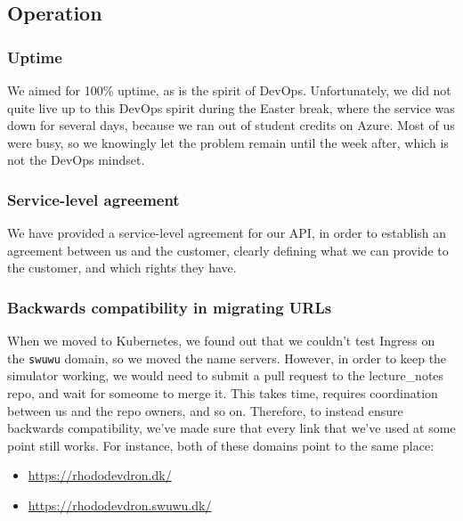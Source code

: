 \subsection{Operation}

\subsubsection{Uptime}

We aimed for 100\% uptime, as is the spirit of DevOps. Unfortunately, we did not quite live up to this DevOps spirit during the Easter break, where the service was down for several days, because we ran out of student credits on Azure. Most of us were busy, so we knowingly let the problem remain until the week after, which is not the DevOps mindset.


\subsubsection{Service-level agreement}

We have provided a service-level agreement \cite{sla:itu-minitwit} for our API, in order to establish an agreement between us and the customer, clearly defining what we can provide to the customer, and which rights they have.


\subsubsection{Backwards compatibility in migrating URLs}

When we moved to Kubernetes, we found out that we couldn't test Ingress on the \texttt{swuwu} domain, so we moved the name servers.
However, in order to keep the simulator working, we would need to submit a pull request to the lecture\_notes repo, and wait for someome to merge it. This takes time, requires coordination between us and the repo owners, and so on. Therefore, to instead ensure backwards compatibility, we've made sure that every link that we've used at some point still works.
For instance, both of these domains point to the same place:
\begin{itemize}
    \item \url{https://rhododevdron.dk/}
    \item \url{https://rhododevdron.swuwu.dk/}
\end{itemize}
